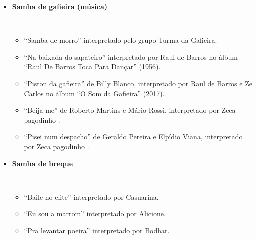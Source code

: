 \begin{itemize}
\item \textbf{Samba de gafieira (música)}
\begin{example} ~
\begin{itemize}
\item ``Samba de morro'' interpretado pelo grupo Turma da Gafieira.
\item ``Na baixada do sapateiro'' interpretado por Raul de Barros no álbum ``Raul De Barros Toca Para Dançar'' (1956). %
\item ``Piston da gafieira'' de Billy Blanco, interpretado por Raul de Barros e Ze Carlos no álbum ``O Som da Gafieira'' (2017).
\item ``Beija-me'' de Roberto Martins e Mário Rossi, interpretado por Zeca pagodinho \cite{barbosa2014zeca}.
\item ``Pisei num despacho'' de Geraldo Pereira e Elpídio Viana, interpretado por Zeca pagodinho \cite{barbosa2014zeca}.
\end{itemize}
\end{example} 

\item \textbf{Samba de breque}
\begin{example} ~
\begin{itemize}
\item ``Baile no elite'' interpretado por Casuarina.
\item ``Eu sou a marrom'' interpretado por Alicione.
\item ``Pra levantar poeira'' interpretado por Bodhar.
\end{itemize}
\end{example} 


\end{itemize}
